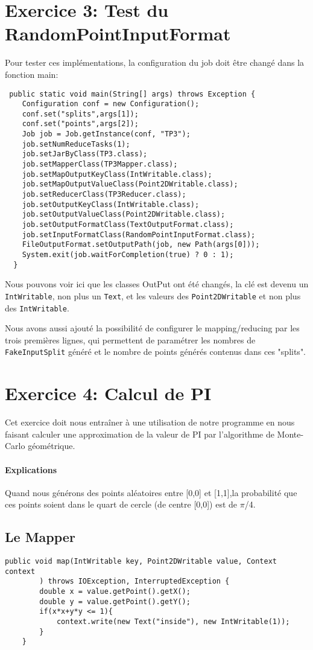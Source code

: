 \documentclass[a4paper]{article}
\begin{document}
\section{Exercice 3: Test du RandomPointInputFormat}
Pour tester ces implémentations, la configuration du job doit être changé dans la fonction main:
\begin{lstlisting}
 public static void main(String[] args) throws Exception {
    Configuration conf = new Configuration();
    conf.set("splits",args[1]);
    conf.set("points",args[2]);
    Job job = Job.getInstance(conf, "TP3");
    job.setNumReduceTasks(1);
    job.setJarByClass(TP3.class);
    job.setMapperClass(TP3Mapper.class);
    job.setMapOutputKeyClass(IntWritable.class);
    job.setMapOutputValueClass(Point2DWritable.class);
    job.setReducerClass(TP3Reducer.class);
    job.setOutputKeyClass(IntWritable.class);
    job.setOutputValueClass(Point2DWritable.class);
    job.setOutputFormatClass(TextOutputFormat.class);
    job.setInputFormatClass(RandomPointInputFormat.class);
    FileOutputFormat.setOutputPath(job, new Path(args[0]));
    System.exit(job.waitForCompletion(true) ? 0 : 1);
  }
\end{lstlisting}
Nous pouvons voir ici que les classes OutPut ont été changés, la clé est devenu un \verb?IntWritable?, non plus un \verb?Text?, et les valeurs des \verb?Point2DWritable? et non plus des \verb?IntWritable?.

Nous avons aussi ajouté la possibilité de configurer le mapping/reducing par les trois premières lignes, qui permettent de paramétrer les nombres d\newline e \verb?FakeInputSplit? généré et le nombre de points générés contenus dans ces "splits".

\section{Exercice 4: Calcul de PI}
Cet exercice doit nous entraîner à une utilisation de notre programme en nous faisant calculer une approximation de la valeur de PI par l'algorithme de Monte-Carlo géométrique.

\paragraph{Explications} Quand nous générons des points aléatoires entre [0,0] et [1,1],la probabilité que ces points soient dans le quart de cercle (de centre [0,0]) est de $\pi$/4.

\subsection{Le Mapper}
\begin{lstlisting}
public void map(IntWritable key, Point2DWritable value, Context context
        ) throws IOException, InterruptedException {
        double x = value.getPoint().getX();
        double y = value.getPoint().getY();
        if(x*x+y*y <= 1){
            context.write(new Text("inside"), new IntWritable(1));
        }
    }
\end{lstlisting}
\end{document}
